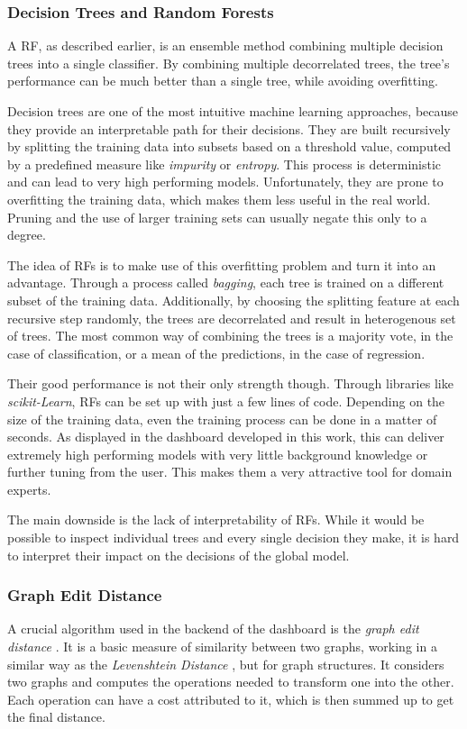 \documentclass[a4paper, 12pt]{article}
\begin{document}
\subsubsection{Decision Trees and Random Forests}
A RF, as described earlier, is an ensemble method combining multiple decision trees into a
single classifier. By combining multiple decorrelated trees, the tree's performance can be
much better than a single tree, while avoiding overfitting.
\par
Decision trees are one of the most intuitive machine learning approaches, because they
provide an interpretable path for their decisions. They are built recursively by splitting
the training data into subsets based on a threshold value, computed by a predefined measure
like \textit{impurity} or \textit{entropy}. This process is deterministic and can lead to
very high performing models. Unfortunately, they are prone to overfitting the training data,
which makes them less useful in the real world. Pruning and the use of larger training
sets can usually negate this only to a degree. \par

The idea of RFs is to make use of this overfitting problem and turn it into an advantage.
Through a process called \textit{bagging}, each tree is trained on a different subset of the
training data. Additionally, by choosing the splitting feature at each recursive step
randomly, the trees are decorrelated and result in heterogenous set of trees. The most
common way of combining the trees is a majority vote, in the case of classification, or a
mean of the predictions, in the case of regression. \par

Their good performance is not their only strength though. Through libraries like
\textit{scikit-Learn}, RFs can be set up with just a few lines of code. Depending on the size
of the training data, even the training process can be done in a matter of seconds. As
displayed in the dashboard developed in this work, this can deliver extremely high performing
models with very little background knowledge or further tuning from the user. This makes them
a very attractive tool for domain experts. \par

The main downside is the lack of interpretability of RFs. While it would be possible to inspect
individual trees and every single decision they make, it is hard to interpret their impact on
the decisions of the global model.

\subsubsection{Graph Edit Distance}
A crucial algorithm used in the backend of the dashboard is the \textit{graph edit distance}
\cite{sanfeliu1983distance}. It is a basic measure of similarity between two graphs, working in
a similar way as the \textit{Levenshtein Distance} \cite{levenshtein1966binary}, but for graph
structures. It considers two graphs and computes the operations needed to transform one into the
other. Each operation can have a cost attributed to it, which is then summed up to get the final
distance. \par
\end{document}
